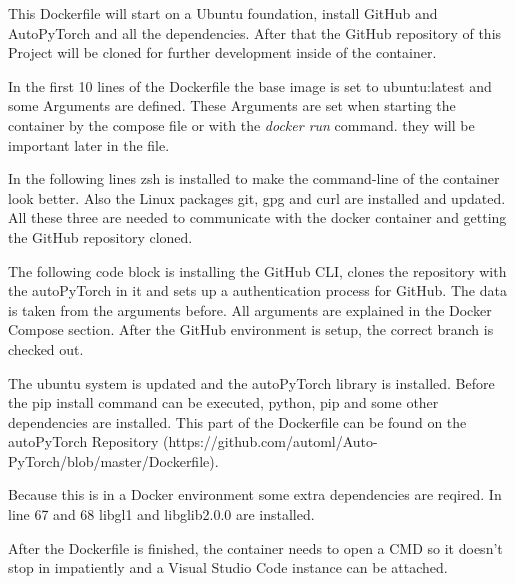 \documentclass[a4paper, 12pt, oneside]{scrbook}
\begin{document}
		\noindent This Dockerfile will start on a Ubuntu foundation, install GitHub and AutoPyTorch and all the dependencies. After that the GitHub repository of this Project will be cloned for further development inside of the container. 
		
		\noindent In the first 10 lines of the Dockerfile the base image is set to ubuntu:latest and some Arguments are defined. These Arguments are set when starting the container by the compose file or with the \textit{docker run} command. they will be important later in the file. 
		
		
		\noindent 
		
		\noindent In the following lines zsh is installed to make the command-line of the container look better. Also the Linux packages git, gpg and curl are installed and updated. All these three are needed to communicate with the docker container and getting the GitHub repository cloned.
		
		\noindent 
		
		\noindent The following code block is installing the GitHub CLI, clones the repository with the autoPyTorch in it and sets up a authentication process for GitHub. The data is taken from the arguments before. All arguments are explained in the Docker Compose section. After the GitHub environment is setup, the correct branch is checked out. 
		
		\noindent 
		
		\noindent The ubuntu system is updated and the autoPyTorch library is installed. Before the pip install command can be executed, python, pip and some other dependencies are installed. This part of the Dockerfile can be found on the autoPyTorch Repository (https://github.com/automl/Auto-PyTorch/blob/master/Dockerfile). 
		
		\noindent Because this is in a Docker environment some extra dependencies are reqired. In line 67 and 68 libgl1 and libglib2.0.0 are installed. 
		
		\noindent 
		
		\noindent After the Dockerfile is finished, the container needs to open a CMD so it doesn't stop in impatiently and a Visual Studio Code instance can be attached.
		
\end{document}
